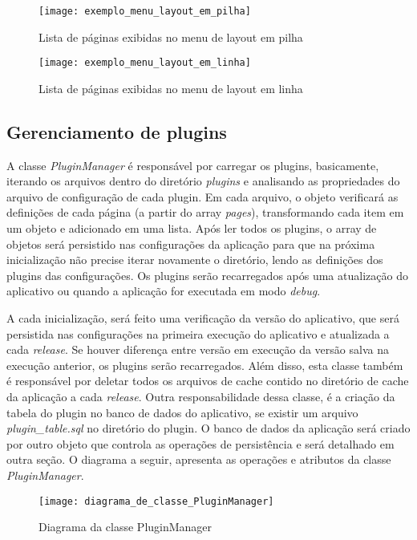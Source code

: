 \begin{figure}[H]
	\texttt{[image: exemplo\_menu\_layout\_em\_pilha]}
	\centering
	\caption{Lista de páginas exibidas no menu de layout em pilha}
\end{figure}

\begin{figure}[H]
	\texttt{[image: exemplo\_menu\_layout\_em\_linha]}
	\centering
	\caption{Lista de páginas exibidas no menu de layout em linha}
\end{figure}


\subsection{Gerenciamento de plugins}\label{sec:solucao-desenvolvida}
A classe \textit{PluginManager} é responsável por carregar os plugins, basicamente, iterando os arquivos dentro do diretório \textit{plugins} e analisando as propriedades do arquivo de configuração de cada plugin. Em cada arquivo, o objeto verificará as definições de cada página (a partir do array \textit{pages}), transformando cada item em um objeto e adicionado em uma lista. Após ler todos os plugins, o array de objetos será persistido nas configurações da aplicação para que na próxima inicialização não precise iterar novamente o diretório, lendo as definições dos plugins das configurações. Os plugins serão recarregados após uma atualização do aplicativo ou quando a aplicação for executada em modo \textit{debug}.\par
A cada inicialização, será feito uma verificação da versão do aplicativo, que será persistida nas configurações na primeira execução do aplicativo e atualizada a cada \textit{release}. Se houver diferença entre versão em execução da versão salva na execução anterior, os plugins serão recarregados. Além disso, esta classe também é responsável por deletar todos os arquivos de cache contido no diretório de cache da aplicação a cada \textit{release}. Outra responsabilidade dessa classe, é a criação da tabela do plugin no banco de dados do aplicativo, se existir um arquivo \textit{plugin\_table.sql} no diretório do plugin. O banco de dados da aplicação será criado por outro objeto que controla as operações de persistência e será detalhado em outra seção. O diagrama a seguir, apresenta as operações e atributos da classe \textit{PluginManager}.

\begin{figure}[H]
	\texttt{[image: diagrama\_de\_classe\_PluginManager]}
	\centering
	\caption{Diagrama da classe PluginManager}
\end{figure}

